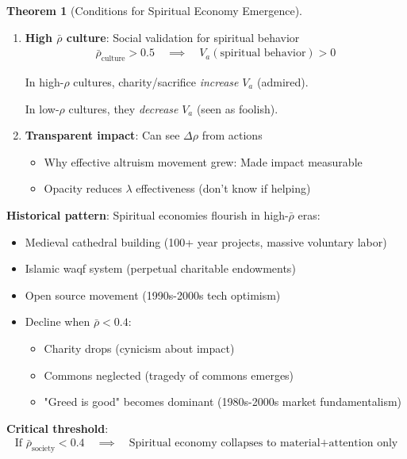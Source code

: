\documentclass[11pt,a4paper]{article}
\theoremstyle{definition}
\newtheorem{theorem}{Theorem}[section]
\theoremstyle{remark}
\begin{document}
\begin{enumerate}
\begin{theorem}[Conditions for Spiritual Economy Emergence]
\begin{enumerate}
    \item \textbf{High \(\bar{\rho}\) culture}: Social validation for spiritual behavior
        \begin{align}
        \bar{\rho}_{\text{culture}} > 0.5 \quad \implies \quad V_a(\text{spiritual behavior}) > 0
        \end{align}
        
        In high-\(\rho\) cultures, charity/sacrifice \textit{increase} \(V_a\) (admired).
        
        In low-\(\rho\) cultures, they \textit{decrease} \(V_a\) (seen as foolish).
    
    \item \textbf{Transparent impact}: Can see \(\Delta\rho\) from actions
        \begin{itemize}
            \item Why effective altruism movement grew: Made impact measurable
            \item Opacity reduces \(\lambda\) effectiveness (don't know if helping)
        \end{itemize}
\end{enumerate}

\textbf{Historical pattern}: Spiritual economies flourish in high-\(\bar{\rho}\) eras:
\begin{itemize}
    \item Medieval cathedral building (100+ year projects, massive voluntary labor)
    \item Islamic waqf system (perpetual charitable endowments)
    \item Open source movement (1990s-2000s tech optimism)
\end{itemize}

\begin{itemize}
    \item Decline when \(\bar{\rho} < 0.4\):
    \begin{itemize}
        \item Charity drops (cynicism about impact)
        \item Commons neglected (tragedy of commons emerges)
        \item "Greed is good" becomes dominant (1980s-2000s market fundamentalism)
    \end{itemize}
\end{itemize}

\textbf{Critical threshold}:
\begin{align}
\text{If } \bar{\rho}_{\text{society}} < 0.4 \quad \implies \quad \text{Spiritual economy collapses to material+attention only}
\end{align}


\end{theorem}
\end{enumerate}
\end{document}
